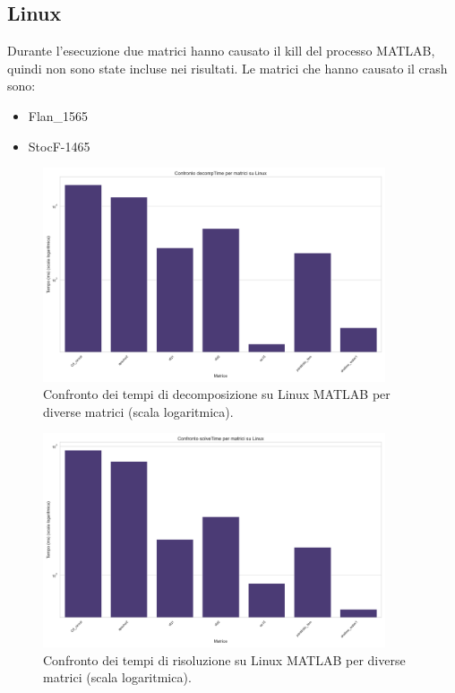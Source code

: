 \subsection{Linux}

Durante l'esecuzione due matrici hanno causato il kill del processo MATLAB, quindi non sono state incluse nei risultati. Le matrici che hanno causato il crash sono:
\begin{itemize}
    \item Flan\_1565
    \item StocF-1465
\end{itemize}

\begin{figure}[H]
    \centering
    \includegraphics[width=0.9\textwidth]{images/MATLAB/Linux/decompTime_comparison}
    \caption{Confronto dei tempi di decomposizione su Linux MATLAB per diverse matrici (scala logaritmica).}
    \label{fig:matlab-linux-decomp-comparison}
\end{figure}

\begin{figure}[H]
    \centering
    \includegraphics[width=0.9\textwidth]{images/MATLAB/Linux/solveTime_comparison}
    \caption{Confronto dei tempi di risoluzione su Linux MATLAB per diverse matrici (scala logaritmica).}
    \label{fig:matlab-linux-solve-comparison}
\end{figure}

